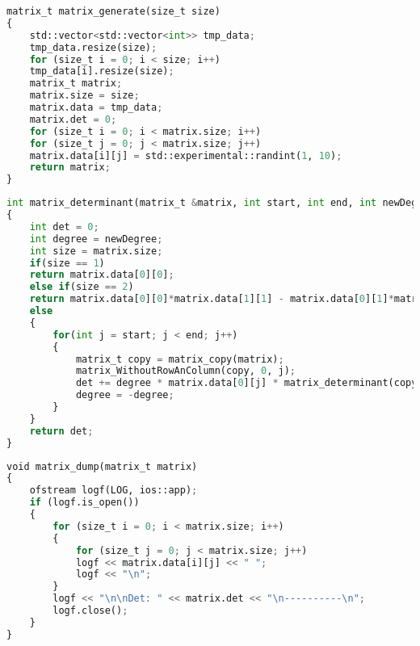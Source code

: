 \begin{center}
	\captionsetup{skip=0pt,justification=raggedright,singlelinecheck=off}
	\begin{lstlisting}[label=lst:gen,language=Python,caption=Алгоритм генерации квадратной матрицы]
matrix_t matrix_generate(size_t size)
{
	std::vector<std::vector<int>> tmp_data;
	tmp_data.resize(size);
	for (size_t i = 0; i < size; i++)
	tmp_data[i].resize(size);
	matrix_t matrix;
	matrix.size = size;
	matrix.data = tmp_data;
	matrix.det = 0;
	for (size_t i = 0; i < matrix.size; i++)
	for (size_t j = 0; j < matrix.size; j++)
	matrix.data[i][j] = std::experimental::randint(1, 10);
	return matrix;
}
	\end{lstlisting}
\end{center}
\begin{center}
	\captionsetup{skip=0pt,justification=raggedright,singlelinecheck=off}
	\begin{lstlisting}[label=lst:det,language=Python,caption=Алгоритм вычисления детерминанта матрицы]
int matrix_determinant(matrix_t &matrix, int start, int end, int newDegree)
{
	int det = 0;
	int degree = newDegree;
	int size = matrix.size;
	if(size == 1)
	return matrix.data[0][0];
	else if(size == 2)
	return matrix.data[0][0]*matrix.data[1][1] - matrix.data[0][1]*matrix.data[1][0];
	else
	{
		for(int j = start; j < end; j++)
		{
			matrix_t copy = matrix_copy(matrix);
			matrix_WithoutRowAnColumn(copy, 0, j);
			det += degree * matrix.data[0][j] * matrix_determinant(copy, 0, copy.size, 1);;
			degree = -degree;
		}
	}
	return det;
}
	\end{lstlisting}
\end{center}
\clearpage
\begin{center}
\captionsetup{skip=0pt,justification=raggedright,singlelinecheck=off}
\begin{lstlisting}[label=lst:dump,language=Python,caption=Алгоритм записи матрицы и детерминанта в файл]
void matrix_dump(matrix_t matrix)
{
	ofstream logf(LOG, ios::app);
	if (logf.is_open())
	{
		for (size_t i = 0; i < matrix.size; i++)
		{
			for (size_t j = 0; j < matrix.size; j++)
			logf << matrix.data[i][j] << " ";
			logf << "\n";
		}
		logf << "\n\nDet: " << matrix.det << "\n----------\n";
		logf.close();
	}
}
\end{lstlisting}
\end{center}

